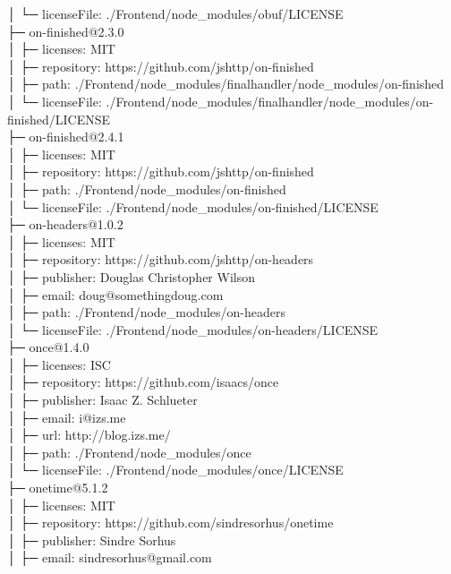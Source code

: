 \documentclass[
    paper=a4,
    twoside=false,
    parskip=half,
    listof=entryprefix,
    listof=totoc,
    index=totoc,
    bibliography=totoc,
    headsepline,
]{scrbook}
\begin{document}
    │  └─ licenseFile: ./Frontend/node\_modules/obuf/LICENSE\\
    ├─ on-finished@2.3.0\\
    │  ├─ licenses: MIT\\
    │  ├─ repository: https://github.com/jshttp/on-finished\\
    │  ├─ path: ./Frontend/node\_modules/finalhandler/node\_modules/on-finished\\
    │  └─ licenseFile: ./Frontend/node\_modules/finalhandler/node\_modules/on-finished/LICENSE\\
    ├─ on-finished@2.4.1\\
    │  ├─ licenses: MIT\\
    │  ├─ repository: https://github.com/jshttp/on-finished\\
    │  ├─ path: ./Frontend/node\_modules/on-finished\\
    │  └─ licenseFile: ./Frontend/node\_modules/on-finished/LICENSE\\
    ├─ on-headers@1.0.2\\
    │  ├─ licenses: MIT\\
    │  ├─ repository: https://github.com/jshttp/on-headers\\
    │  ├─ publisher: Douglas Christopher Wilson\\
    │  ├─ email: doug@somethingdoug.com\\
    │  ├─ path: ./Frontend/node\_modules/on-headers\\
    │  └─ licenseFile: ./Frontend/node\_modules/on-headers/LICENSE\\
    ├─ once@1.4.0\\
    │  ├─ licenses: ISC\\
    │  ├─ repository: https://github.com/isaacs/once\\
    │  ├─ publisher: Isaac Z. Schlueter\\
    │  ├─ email: i@izs.me\\
    │  ├─ url: http://blog.izs.me/\\
    │  ├─ path: ./Frontend/node\_modules/once\\
    │  └─ licenseFile: ./Frontend/node\_modules/once/LICENSE\\
    ├─ onetime@5.1.2\\
    │  ├─ licenses: MIT\\
    │  ├─ repository: https://github.com/sindresorhus/onetime\\
    │  ├─ publisher: Sindre Sorhus\\
    │  ├─ email: sindresorhus@gmail.com\\
\end{document}
